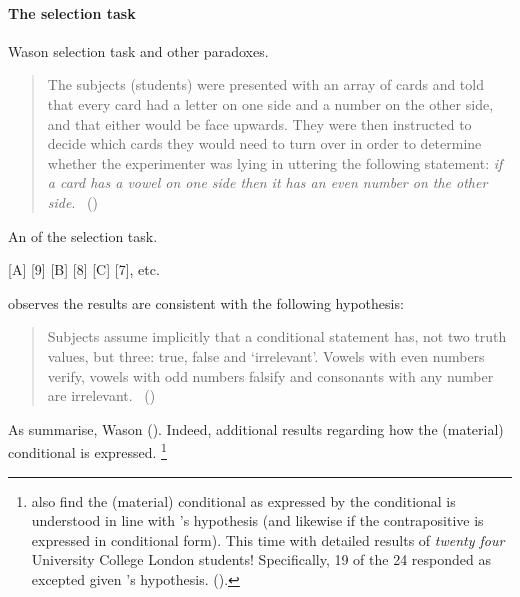 \paragraph{The selection task}
\nocite{Wason:1968aa}
\nocite{wason1971natural}

\begin{note}
  Wason selection task and other paradoxes.

  \begin{quote}
    The subjects (students) were presented with an array of cards and told that every card had a letter on one side and a number on the other side, and that either would be face upwards.
    They were then instructed to decide which cards they would need to turn over in order to determine whether the experimenter was lying in uttering the following statement:
    \emph{if a card has a vowel on one side then it has an even number on the other side}.%
    \mbox{ }\hfill\mbox{(\citeyear[145--146]{Wason:1966aa})}
  \end{quote}

  \begin{center}
    An  of the selection task.

    [A] [9] [B] [8] [C] [7], etc.
  \end{center}

  \citeauthor{Wason:1966aa} observes the results are consistent with the following hypothesis:
  \begin{quote}
    Subjects assume implicitly that a conditional statement has, not two truth values, but three: true, false and `irrelevant'.
    Vowels with even numbers verify, vowels with odd numbers falsify and consonants with any number are irrelevant.%
    \mbox{ }\hfill\mbox{(\citeyear[146]{Wason:1966aa})}
  \end{quote}

  As \citeauthor{Johnson-Laird:1969aa} summarise, Wason  (\citeyear[367]{Johnson-Laird:1969aa}).
  Indeed, \citeauthor{Johnson-Laird:1969aa} additional results regarding how the (material) conditional is expressed.%
  \footnote{
    \citeauthor{Johnson-Laird:1969aa} also find the (material) conditional as expressed by the conditional is understood in line with \citeauthor{Wason:1966aa}'s hypothesis (and likewise if the contrapositive is expressed in conditional form).
    This time with detailed results of \emph{twenty four} University College London students!
    Specifically, 19 of the 24 responded as excepted given \citeauthor{Wason:1966aa}'s hypothesis.
    (\citeyear[369,370]{Johnson-Laird:1969aa}).
  }
\end{note}

